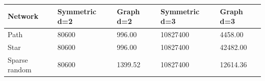 \begin{tabular}{lllll}
\hline
Network & Symmetric d=2 & Graph d=2 & Symmetric d=3 & Graph d=3 \\
\hline
Path & 80600 & 996.00 & 10827400 & 4458.00 \\
Star & 80600 & 996.00 & 10827400 & 42482.00 \\
Sparse random & 80600 & 1399.52 & 10827400 & 12614.36 \\
\hline
\end{tabular}
